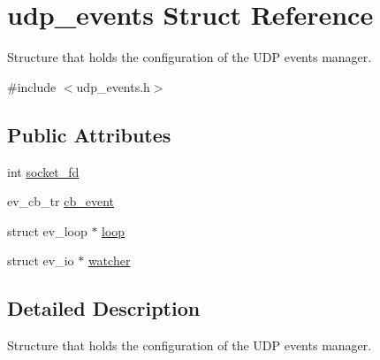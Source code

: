 \hypertarget{structudp__events}{\section{udp\-\_\-events \-Struct \-Reference}
\label{structudp__events}
}


\-Structure that holds the configuration of the \-U\-D\-P events manager.  




{\ttfamily \#include $<$udp\-\_\-events.\-h$>$}

\subsection*{\-Public \-Attributes}
\begin{DoxyCompactItemize}
\item 
int \hyperlink{structudp__events_a00ffd8627929bc97337b12bbde552a3c}{socket\-\_\-fd}
\item 
ev\-\_\-cb\-\_\-tr \hyperlink{structudp__events_af1d93273b21147bc474129eaed1a4c2b}{cb\-\_\-event}
\item 
struct ev\-\_\-loop $\ast$ \hyperlink{structudp__events_a5f6feacee2f88e4b88dac97c35ac7ecf}{loop}
\item 
struct ev\-\_\-io $\ast$ \hyperlink{structudp__events_a8d254ac5c405901ecb300d0abc604bd8}{watcher}
\end{DoxyCompactItemize}


\subsection{\-Detailed \-Description}
\-Structure that holds the configuration of the \-U\-D\-P events manager. 

